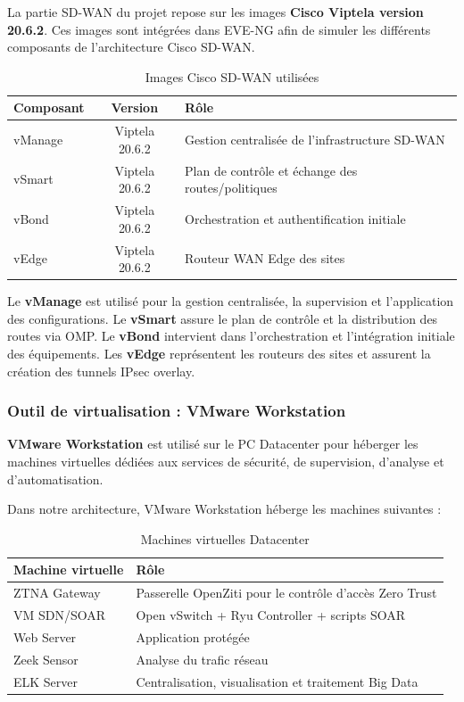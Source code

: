 \documentclass[12pt,a4paper,oneside]{report}
\begin{document}
	La partie SD-WAN du projet repose sur les images \textbf{Cisco Viptela version 20.6.2}. Ces images sont intégrées dans EVE-NG afin de simuler les différents composants de l'architecture Cisco SD-WAN.
	
	\begin{table}[H]
		\centering
		\renewcommand{\arraystretch}{1.2}
		\begin{tabular}{|l|c|p{}|}
			\hline
			\textbf{Composant} & \textbf{Version} & \textbf{Rôle} \\
			\hline
			vManage & Viptela 20.6.2 & Gestion centralisée de l'infrastructure SD-WAN \\
			\hline
			vSmart & Viptela 20.6.2 & Plan de contrôle et échange des routes/politiques \\
			\hline
			vBond & Viptela 20.6.2 & Orchestration et authentification initiale \\
			\hline
			vEdge & Viptela 20.6.2 & Routeur WAN Edge des sites \\
			\hline
		\end{tabular}
		\caption{Images Cisco SD-WAN utilisées}
		\label{tab:images-cisco-sdwan}
	\end{table}
	
	Le \textbf{vManage} est utilisé pour la gestion centralisée, la supervision et l'application des configurations. Le \textbf{vSmart} assure le plan de contrôle et la distribution des routes via OMP. Le \textbf{vBond} intervient dans l'orchestration et l'intégration initiale des équipements. Les \textbf{vEdge} représentent les routeurs des sites et assurent la création des tunnels IPsec overlay.
	
	\subsubsection{Outil de virtualisation : VMware Workstation}
	
	\textbf{VMware Workstation} est utilisé sur le PC Datacenter pour héberger les machines virtuelles dédiées aux services de sécurité, de supervision, d'analyse et d'automatisation.
	
	Dans notre architecture, VMware Workstation héberge les machines suivantes :
	
	\begin{table}[H]
		\centering
		\renewcommand{\arraystretch}{1.2}
		\begin{tabular}{|l|p{}|}
			\hline
			\textbf{Machine virtuelle} & \textbf{Rôle} \\
			\hline
			ZTNA Gateway & Passerelle OpenZiti pour le contrôle d'accès Zero Trust \\
			\hline
			VM SDN/SOAR & Open vSwitch + Ryu Controller + scripts SOAR\\
			\hline
			Web Server & Application protégée \\
			\hline
			Zeek Sensor & Analyse du trafic réseau \\
			\hline
			ELK Server & Centralisation, visualisation et traitement Big Data \\
			\hline
		\end{tabular}
		\caption{Machines virtuelles Datacenter}
		\label{tab:vm-datacenter}
	\end{table}
	
\end{document}
